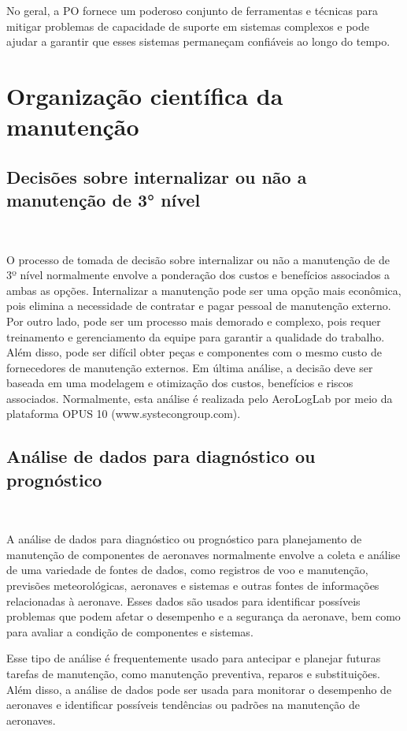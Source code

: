 \documentclass{amsart}
\begin{document}
No geral, a PO fornece um poderoso conjunto de ferramentas e técnicas para mitigar problemas de capacidade de suporte em sistemas complexos e pode ajudar a garantir que esses sistemas permaneçam confiáveis ao longo do tempo.


\section{Organização científica da manutenção}


\subsection{Decisões sobre internalizar ou não a manutenção de 3° nível}\

O processo de tomada de decisão sobre internalizar ou não a manutenção de de 3º nível normalmente envolve a ponderação dos custos e benefícios associados a ambas as opções. Internalizar a manutenção pode ser uma opção mais econômica, pois elimina a necessidade de contratar e pagar pessoal de manutenção externo. Por outro lado, pode ser um processo mais demorado e complexo, pois requer treinamento e gerenciamento da equipe para garantir a qualidade do trabalho. Além disso, pode ser difícil obter peças e componentes com o mesmo custo de fornecedores de manutenção externos. Em última análise, a decisão deve ser baseada em uma modelagem e otimização dos custos, benefícios e riscos associados.
Normalmente, esta análise é realizada pelo AeroLogLab por meio da plataforma OPUS 10 (www.systecongroup.com).

\subsection{Análise de dados para diagnóstico ou prognóstico}\

A análise de dados para diagnóstico ou prognóstico para planejamento de manutenção de componentes de aeronaves normalmente envolve a coleta e análise de uma variedade de fontes de dados, como registros de voo e manutenção, previsões meteorológicas, aeronaves e sistemas e outras fontes de informações relacionadas à aeronave. Esses dados são usados para identificar possíveis problemas que podem afetar o desempenho e a segurança da aeronave, bem como para avaliar a condição de componentes e sistemas.

Esse tipo de análise é frequentemente usado para antecipar e planejar futuras tarefas de manutenção, como manutenção preventiva, reparos e substituições. Além disso, a análise de dados pode ser usada para monitorar o desempenho de aeronaves e identificar possíveis tendências ou padrões na manutenção de aeronaves.
\end{document}
